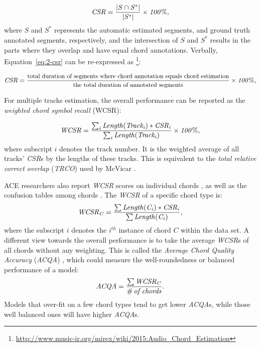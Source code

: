 \begin{equation}
\mathit{CSR = {|S\cap S^*|\over|S^*|} \times 100\%,}
\label{eq:2-csr}
\end{equation}
where $S$ and $S^*$ represents the automatic estimated segments, and ground truth annotated segments, respectively, and the intersection of $S$ and $S^*$ results in the parts where they overlap and have equal chord annotations. Verbally, Equation~\ref{eq:2-csr} can be re-expressed as \footnote{\url{http://www.music-ir.org/mirex/wiki/2015:Audio\_Chord\_Estimation}}:

\begin{equation}\footnotesize
\mathit{CSR = {\text{total duration of segments where chord annotation equals chord estimation}\over\text{the total duration of annotated segments}} \times 100\%,}
\label{eq:2-csrv}
\end{equation}

For multiple tracks estimation, the overall performance can be reported as the {\it weighted chord symbol recall} (WCSR):

\begin{equation}
\mathit{WCSR = {\sum_i{Length(Track_i)*CSR_i} \over \sum_i{Length(Track_i)}}\times 100\%,}
\label{eq:2-wcsr}
\end{equation}
where subscript $i$ denotes the track number. It is the weighted average of all tracks' \textit{CSR}s by the lengths of these tracks. This is equivalent to the {\it total relative correct overlap} (\textit{TRCO}) used by McVicar \cite{mcvicar2013machine}.

ACE researchers also report \textit{WCSR} scores on individual chords \cite{mauch2010automatic}, as well as the confusion tables among chords \cite{mauch2010automatic,oudre2010template,papadopoulos2010joint,khadkevich2011music}. The \textit{WCSR} of a specific chord type is:
\begin{equation}
\mathit{WCSR_{C} = {\sum{Length(C_i)*CSR_i} \over \sum{Length(C_i)}}},
\label{eq:wcsrchord}
\end{equation}
where the subscript $i$ denotes the $i^{th}$ instance of chord $C$ within the data set. A different view towards the overall performance is to take the average \textit{WCSR}s of all chords without any weighting. This is called the \textit{Average Chord Quality Accuracy} (\textit{ACQA}) \cite{cho2014improved}, which could measure the well-roundedness or balanced performance of a model:
\begin{equation}
\mathit{ACQA = {{\sum{WCSR_{C}}} \over {\#\,of\,chords}}}.
\label{eq:2-acqa}
\end{equation}
Models that over-fit on a few chord types tend to get lower \textit{ACQA}s, while those well balanced ones will have higher \textit{ACQA}s.

